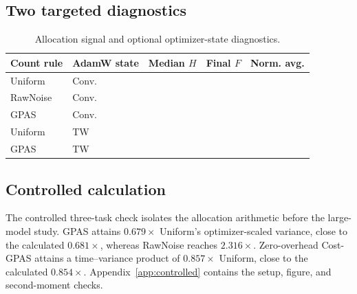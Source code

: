 
\subsection{Two targeted diagnostics}

\begin{table}[H]
\centering
\small
\caption{Allocation signal and optional optimizer-state diagnostics.
}
\label{tab:ablations}
\begin{tabular}{llccc}
\toprule
Count rule & AdamW state & Median $H$ & Final $F$ & Norm. avg. \\
\midrule
Uniform & Conv. & & & \\
RawNoise & Conv. & & & \\
GPAS & Conv. & & & \\
Uniform & TW & & & \\
GPAS & TW & & & \\
\bottomrule
\end{tabular}
\end{table}


\subsection{Controlled calculation}

The controlled three-task check isolates the allocation arithmetic before the
large-model study. GPAS attains $0.679\times$ Uniform's optimizer-scaled
variance, close to the calculated $0.681\times$, whereas RawNoise reaches
$2.316\times$. Zero-overhead Cost-GPAS attains a time--variance product of
$0.857\times$ Uniform, close to the calculated $0.854\times$.
Appendix~\ref{app:controlled} contains the setup, figure, and second-moment
checks.
